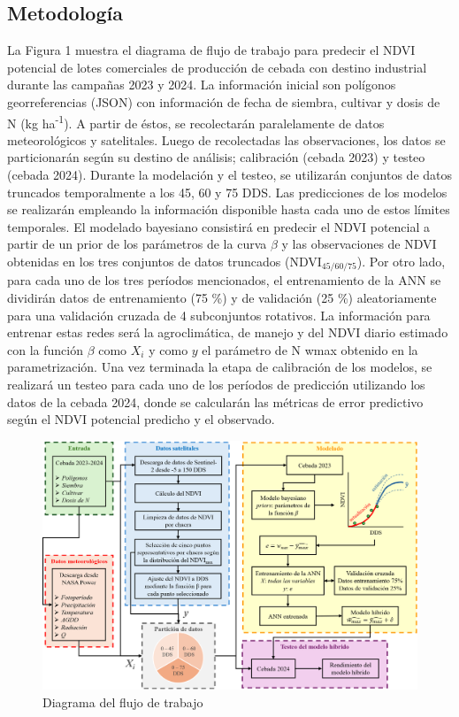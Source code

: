 \documentclass[
11pt, %
]{charter}
\begin{document}
\subsection{Metodología}
\label{sec:descripcion}
La Figura 1 muestra el diagrama de flujo de trabajo para predecir el NDVI potencial de lotes comerciales de producción de cebada con destino industrial durante las campañas 2023 y 2024. La información inicial son polígonos georreferencias (JSON) con información de fecha de siembra, cultivar y dosis de N (kg ha\textsuperscript{-1}). A partir de éstos, se recolectarán paralelamente de datos meteorológicos y satelitales.  Luego de recolectadas las observaciones, los datos se particionarán según su destino de análisis; calibración (cebada 2023) y testeo (cebada 2024).  Durante la modelación y el testeo, se utilizarán conjuntos de datos truncados temporalmente a los 45, 60 y 75 DDS. Las predicciones de los modelos se realizarán empleando la información disponible hasta cada uno de estos límites temporales. El modelado bayesiano consistirá en predecir el NDVI potencial a partir de un prior de los parámetros de la curva $\beta$ y las observaciones de NDVI obtenidas en los tres conjuntos de datos truncados (NDVI$_{45/60/75}$). Por otro lado, para cada uno de los tres períodos mencionados, el entrenamiento de la ANN se dividirán datos de entrenamiento (75 \%) y de validación (25 \%) aleatoriamente para una validación cruzada de 4 subconjuntos rotativos. La información para entrenar estas redes será la agroclimática, de manejo y del NDVI diario estimado con la función $\beta$ como $X_i$ y como $y$ el parámetro de N wmax obtenido en la parametrización. Una vez terminada la etapa de calibración de los modelos, se realizará un testeo para cada uno de los períodos de predicción utilizando los datos de la cebada 2024, donde se calcularán las métricas de error predictivo según el NDVI potencial predicho y el observado.   


\begin{figure}[htpb]
\centering 
\includegraphics[width=.95\textwidth]{./Figuras/Flujo_de_Trabajo.png}
\caption{Diagrama del flujo de trabajo}
\label{fig:Flujo_de_Trabajo}
\end{figure}
\end{document}
